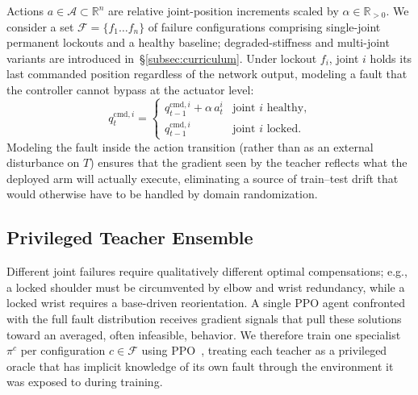 \documentclass{article}
\begin{document}
		Actions $a\in\mathcal{A}\subset \mathbb{R}^n$ are relative joint-position increments scaled by
		$\alpha\in \mathbb{R}_{>0}$. We consider a set $\mathcal{F}=\{f_1 \ldots f_n\}$ of failure configurations comprising
		single-joint permanent lockouts and a healthy baseline; degraded-stiffness and
		multi-joint variants are introduced in~\S\ref{subsec:curriculum}. Under lockout
		$f_i$, joint $i$ holds its last commanded position regardless of the network
		output, modeling a fault that the controller cannot bypass at the actuator
		level:
		\begin{equation}
		    q_t^{\mathrm{cmd}, i} =
		        \begin{cases}
		            q_{t-1}^{\mathrm{cmd}, i} + \alpha\,a_t^i & \text{joint } i \text{ healthy,}\\
		            q_{t-1}^{\mathrm{cmd}, i}                  & \text{joint } i \text{ locked.}
		        \end{cases}
		    \label{eq:action}
		\end{equation}
		Modeling the fault inside the action transition (rather than as an external
		disturbance on $T$) ensures that the gradient seen by the teacher reflects what
		the deployed arm will actually execute, eliminating a source of train--test
		drift that would otherwise have to be handled by domain randomization.

	\subsection{Privileged Teacher Ensemble}
	\label{subsec:teachers}

		Different joint failures require qualitatively different optimal compensations; e.g.,
		a locked shoulder must be circumvented by elbow and wrist redundancy, while a
		locked wrist requires a base-driven reorientation. A single PPO agent confronted
		with the full fault distribution receives gradient signals that pull these
		solutions toward an averaged, often infeasible, behavior. We therefore train
		one specialist~$\pi^c$ per configuration $c\in\mathcal{F}$ using
		PPO~\citep{schulman2017proximal}, treating each teacher as a privileged oracle
		that has implicit knowledge of its own fault through the environment it was
		exposed to during training.
\end{document}

